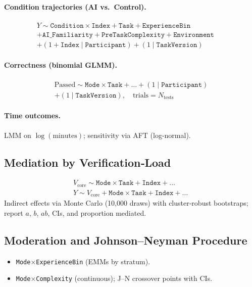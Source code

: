 \documentclass[sigconf]{acmart}
\begin{document}
\paragraph{Condition trajectories (AI vs.\ Control).}
\[
\begin{aligned}
Y \sim \texttt{Condition} \times \texttt{Index} + \texttt{Task} + \texttt{ExperienceBin} \qquad\qquad\quad \\ + \texttt{AI\_Familiarity} + \texttt{PreTaskComplexity} + \texttt{Environment} \\ + (1 + \texttt{Index} \mid \texttt{Participant}) + (1 \mid \texttt{TaskVersion}) \qquad\quad
\end{aligned}
\]
\paragraph{Correctness (binomial GLMM).}
\[
\begin{aligned}
\text{Passed} \sim \texttt{Mode} \times \texttt{Task} + \ldots + (1 \mid \texttt{Participant}) \\ + (1 \mid \texttt{TaskVersion}), \quad \text{trials} = N_{\text{tests}} \quad
\end{aligned}
\]
\paragraph{Time outcomes.} LMM on $\log(\text{minutes})$; sensitivity via AFT (log-normal).

\subsection{Mediation by Verification‑Load}
\label{app:mediation}
\[
\begin{aligned}
V_{\text{core}} \sim \texttt{Mode} \times \texttt{Task} + \texttt{Index} + \ldots \qquad \\
Y \sim V_{\text{core}} + \texttt{Mode} \times \texttt{Task} + \texttt{Index} + \ldots
\end{aligned}
\]
Indirect effects via Monte Carlo (10{,}000 draws) with cluster‑robust bootstraps; report $a$, $b$, $ab$, CIs, and proportion mediated.

\subsection{Moderation and Johnson--Neyman Procedure}
\label{app:moderation}
\begin{itemize}[leftmargin=1.25em]
  \item \texttt{Mode}$\times$\texttt{ExperienceBin} (EMMs by stratum).
  \item \texttt{Mode}$\times$\texttt{Complexity} (continuous); J--N crossover points with CIs.
\end{itemize}
\end{document}
